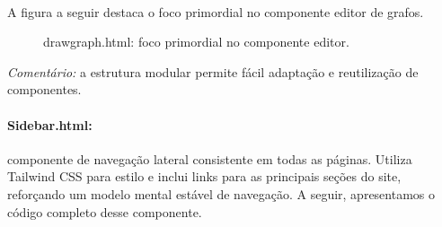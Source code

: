 \documentclass[12pt,a4paper]{article}
\def\texttt#1{#1}%
\def\_{}%
\begin{document}
\paragraph{}
A figura a seguir destaca o foco primordial no componente editor de grafos.

\begin{figure}[H]\centering
    \caption{\texttt{draw\_graph.html}: foco primordial no componente editor.}
\end{figure}
\textit{Comentário:} a estrutura modular permite fácil adaptação e reutilização de componentes.

\paragraph{\texttt{Sidebar.html}:} componente de navegação lateral consistente em todas as páginas. Utiliza Tailwind CSS para estilo e inclui links para as principais seções do site, reforçando um modelo mental estável de navegação. A seguir, apresentamos o código completo desse componente.
\end{document}
